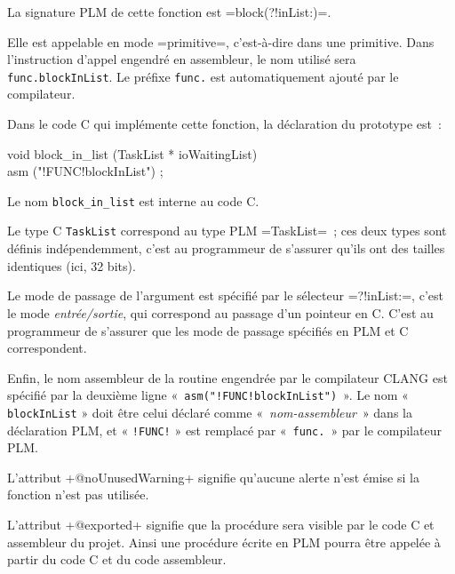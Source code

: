 La signature PLM de cette fonction est \plm=block(?!inList:)=.

Elle est appelable en mode \plm=primitive=, c'est-à-dire dans une primitive. Dans l'instruction d'appel engendré en assembleur, le nom utilisé sera \texttt{func.blockInList}. Le préfixe \texttt{func.} est automatiquement ajouté par le compilateur.

Dans le code C qui implémente cette fonction, la déclaration du prototype est~:

\begin{SHELL}
void block\_in\_list (TaskList * ioWaitingList) \\
asm ("!FUNC!blockInList") ;
\end{SHELL}

Le nom \texttt{block\_in\_list} est interne au code C.

Le type C \texttt{TaskList} correspond au type PLM \plm=TaskList=~; ces deux types sont définis indépendemment, c'est au programmeur de s'assurer qu'ils ont des tailles identiques (ici, 32 bits).

Le mode de passage de l'argument est spécifié par le sélecteur \plm=?!inList:=, c'est le mode \emph{entrée/sortie}, qui correspond au passage d'un pointeur en C. C'est au programmeur de s'assurer que les mode de passage spécifiés en PLM et C correspondent.

Enfin, le nom assembleur de la routine engendrée par le compilateur CLANG est spécifié par la deuxième ligne «~\texttt{asm("!FUNC!blockInList")}~». Le nom « \texttt{blockInList} » doit être celui déclaré comme «~\emph{nom-assembleur}~» dans la déclaration PLM, et « \texttt{!FUNC!} » est remplacé par «~\texttt{func.}~» par le compilateur PLM.






L'attribut \plm+@noUnusedWarning+ signifie qu'aucune alerte n'est émise si la fonction n'est pas utilisée.




L'attribut \plm+@exported+ signifie que la procédure sera visible par le code C et assembleur du projet. Ainsi une procédure écrite en PLM pourra être appelée à partir du code C et du code assembleur.






